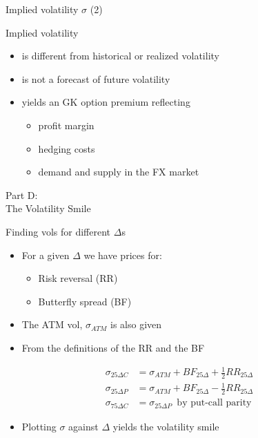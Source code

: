 \begin{frame}{Implied volatility \(\sigma\) (2)}

Implied volatility

\begin{itemize}
\tightlist
\item
  is different from historical or realized volatility\\[2\baselineskip]
\item
  is not a forecast of future volatility\\[2\baselineskip]
\item
  yields an GK option premium reflecting

  \begin{itemize}
  \tightlist
  \item
    profit margin
  \item
    hedging costs
  \item
    demand and supply in the FX market
  \end{itemize}
\end{itemize}

\end{frame}

\begin{frame}{}

\color{blue} \LARGE{Part D:}\\
\LARGE{The Volatility Smile}

\end{frame}

\begin{frame}{Finding vols for different \(\Delta\)s}

\begin{itemize}
\item
  For a given \(\Delta\) we have prices for:

  \begin{itemize}
  \tightlist
  \item
    Risk reversal (RR)
  \item
    Butterfly spread (BF)
  \end{itemize}
\item
  The ATM vol, \(\sigma_{ATM}\) is also given
\item
  From the definitions of the RR and the BF
\end{itemize}

\[
\begin{aligned}
  \sigma_{25\Delta C} &= \sigma_{ATM} + BF_{25\Delta} + \frac{1}{2} RR_{25\Delta}\\
  \sigma_{25\Delta P} &= \sigma_{ATM} + BF_{25\Delta} - \frac{1}{2} RR_{25\Delta}\\
  \sigma_{75\Delta C} &= \sigma_{25\Delta P}\enspace \text{by put-call parity}
\end{aligned}
\]

\begin{itemize}
\tightlist
\item
  Plotting \(\sigma\) against \(\Delta\) yields the volatility smile
\end{itemize}

\end{frame}

